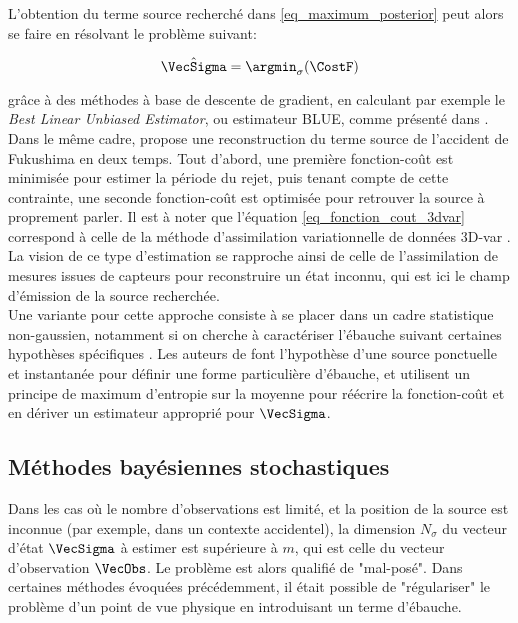  L'obtention du terme source recherché dans \eqref{eq_maximum_posterior} peut alors se faire en résolvant le problème suivant:
 
 \begin{equation}
	 \label{eq_argmin_3dvar}
	 \hat{\VecSigma} = \argmin_\sigma (\CostF)
 \end{equation}
 
 grâce à des méthodes à base de descente de gradient, en calculant  par exemple le \textit{Best Linear Unbiased Estimator}, ou estimateur BLUE, comme présenté dans \cite{Winiarek2012}. \\
 
 Dans le même cadre, \cite{Saunier2013} propose une reconstruction du terme source de l'accident de Fukushima en deux temps. Tout d'abord, une première fonction-coût est minimisée pour estimer la période du rejet, puis tenant compte de cette contrainte, une seconde fonction-coût est optimisée pour retrouver la source à proprement parler. 
 Il est à noter que l'équation \eqref{eq_fonction_cout_3dvar} correspond à celle de la méthode d'assimilation variationnelle de données 3D-var \cite{Courtier1998}. La vision de ce type d'estimation se rapproche ainsi de celle de l'assimilation de mesures issues de capteurs pour reconstruire un état inconnu, qui est ici le champ d'émission de la source recherchée.\\
 
 Une variante pour cette approche consiste à se placer dans un cadre statistique non-gaussien, notamment si on cherche à caractériser l'ébauche suivant certaines hypothèses spécifiques \cite{Bocquet2005a}. Les auteurs de \cite{Krysta2007} font l'hypothèse d'une source ponctuelle et instantanée pour définir une forme particulière d'ébauche, et utilisent un principe de maximum d'entropie sur la moyenne \cite{Jaynes1957} pour réécrire la fonction-coût et en dériver un estimateur approprié pour $\VecSigma$.\\
  

 \subsection{Méthodes bayésiennes stochastiques}
 
 Dans les cas où le nombre d'observations est limité, et la position de la source est inconnue (par exemple, dans un contexte accidentel), la dimension $N_\sigma$ du vecteur d'état $\VecSigma$ à estimer est supérieure à $m$, qui est celle du vecteur d'observation $\VecObs$. Le problème est alors qualifié de "mal-posé". Dans certaines méthodes évoquées précédemment, il était possible de "régulariser" le problème d'un point de vue physique en introduisant un terme d'ébauche. \\
 
